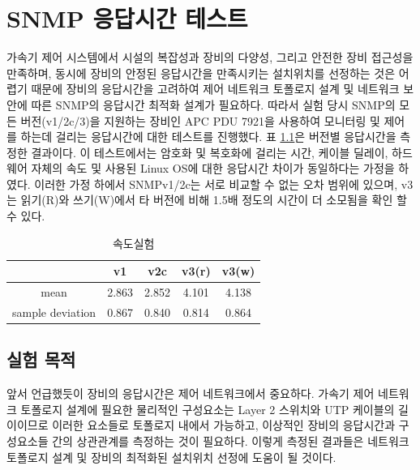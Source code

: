 \documentclass[11pt
  , a4paper
  , article
  , oneside
]{memoir}
\begin{document}
\clearpage

\chapter{SNMP 응답시간 테스트}

가속기 제어 시스템에서 시설의 복잡성과 장비의 다양성, 그리고 안전한 장비 접근성을 만족하며, 동시에 장비의 안정된 응답시간을 만족시키는 설치위치를 선정하는 것은 어렵기 때문에 장비의 응답시간을 고려하여 제어 네트워크 토폴로지 설계 및 네트워크 보안에 따른 SNMP의 응답시간 최적화 설계가 필요하다. 따라서 실험 당시 SNMP의 모든 버전(v1/2c/3)을 지원하는 장비인 APC PDU 7921을 사용하여 모니터링 및 제어를 하는데 걸리는 응답시간에 대한 테스트를 진행했다.
표 \ref{table:test}은 버전별 응답시간을 측정한 결과이다. 이 테스트에서는 암호화 및 복호화에 걸리는 시간, 케이블 딜레이, 하드웨어 자체의 속도 및 사용된 Linux OS에 대한 응답시간 차이가 동일하다는 가정을 하였다. 이러한 가정 하에서 SNMPv1/2c는 서로 비교할 수 없는 오차 범위에 있으며, v3는 읽기(R)와 쓰기(W)에서 타 버전에 비해 1.5배 정도의 시간이 더 소모됨을 확인 할 수 있다.

\begin{table}[h!]
\begin{center}
\begin{tabular}{c|c|c|c|c}\hline
 & v1 & v2c & v3(r) & v3(w) \\ \hline
mean & 2.863 & 2.852 & 4.101 & 4.138 \\ \hline
sample deviation & 0.867 & 0.840 & 0.814 & 0.864 \\ \hline
\end{tabular}
\caption{속도실험}
  \label{table:test}  
\end{center}
\end{table}

\section{실험 목적}
앞서 언급했듯이 장비의 응답시간은 제어 네트워크에서 중요하다. 가속기 제어 네트워크 토폴로지 설계에 필요한 물리적인 구성요소는 Layer 2 스위치와 UTP 케이블의 길이이므로 이러한 요소들로 토폴로지 내에서 가능하고, 이상적인 장비의 응답시간과 구성요소들 간의 상관관계를 측정하는 것이 필요하다. 이렇게 측정된 결과들은 네트워크 토폴로지 설계 및 장비의 최적화된 설치위치 선정에 도움이 될 것이다.
\end{document}
